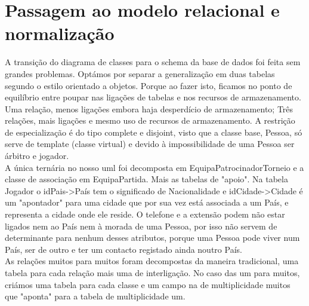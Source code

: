 \documentclass[a4paper]{article}
\begin{document}
\section{Passagem ao modelo relacional e normalização}
A transição do diagrama de classes para o schema da base de dados foi feita sem grandes problemas. Optámos por separar a generalização em duas tabelas segundo o estilo orientado a objetos. Porque ao fazer isto, ficamos no ponto de equilíbrio entre poupar nas ligações de tabelas e nos recursos de armazenamento. Uma relação, menos ligações embora haja desperdício de armazenamento; Três relações, mais ligações e mesmo uso de recursos de armazenamento. A restrição de especialização é do tipo complete e disjoint, visto que a classe base, Pessoa, só serve de template (classe virtual) e devido à impossibilidade de uma Pessoa ser árbitro e jogador.
\\\newline
A única ternária no nosso uml foi decomposta em EquipaPatrocinadorTorneio e a classe de associação em EquipaPartida. Mais as tabelas de "apoio". Na tabela Jogador o idPais->País tem o significado de Nacionalidade e idCidade->Cidade é um "apontador" para uma cidade que por sua vez está associada a um País, e representa a cidade onde ele reside. O telefone e a extensão podem não estar ligados nem ao País nem à morada de uma Pessoa, por isso não servem de determinante para nenhum desses atributos, porque uma Pessoa pode viver num País, ser de outro e ter um contacto registado ainda noutro País.
\\\newline
As relações muitos para muitos foram decompostas da maneira tradicional, uma tabela para cada relação mais uma de interligação. No caso das um para muitos, criámos uma tabela para cada classe e um campo na de multiplicidade muitos que "aponta" para a tabela de multiplicidade um.
\clearpage
\end{document}

